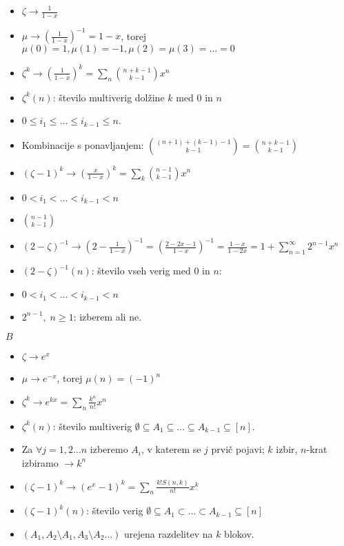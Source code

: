 \documentclass[a4paper, 12pt]{book}
\theoremstyle{definition}
\theoremstyle{remark}
\begin{document}
\begin{itemize}[label={}]
  \item $\zeta \to \frac{1}{1-x}$
  \item $\mu \to \left(\frac{1}{1-x}\right)^{-1} = 1-x$, torej $\mu(0) = 1, \mu(1) = -1, \mu(2) = \mu(3) = \dots = 0$
  \item $\zeta^k \to \left(\frac{1}{1-x}\right)^k = \sum_n \binom{n+k-1}{k-1} x^n$
  \item $\zeta^k(n)$: število multiverig dolžine $k$ med $0$ in $n$
  \item $0 \leq i_1 \leq \dots \leq i_{k-1} \leq n$.
  \item Kombinacije s ponavljanjem: $\binom{(n+1) + (k-1) - 1}{k-1} = \binom{n+k-1}{k-1}$
  \item $(\zeta-1)^k \to \left(\frac{x}{1-x}\right)^k = \sum_k \binom{n-1}{k-1} x^n$
  \item $0 < i_1 < \dots < i_{k-1} < n$
  \item $\binom{n-1}{k-1}$
  \item $(2-\zeta)^{-1} \to \left(2-\frac{1}{1-x}\right)^{-1} = \left(\frac{2-2x-1}{1-x}\right)^{-1}
    = \frac{1-x}{1-2x} = 1 + \sum_{n=1}^{\infty} 2^{n-1} x^n$
  \item $(2-\zeta)^{-1}(n)$: število vseh verig med 0 in $n$:
  \item $0 < i_1 < \dots < i_{k-1} < n$
  \item $2^{n-1}, \; n \geq 1$: izberem ali ne.
\end{itemize}
$B$
\begin{itemize}[label={}]
  \item $\zeta \to e^x$
  \item $\mu \to e^{-x}$, torej $\mu(n) = (-1)^n$
  \item $\zeta^k \to e^{kx} = \sum_n \frac{k^n}{n!} x^n$
  \item $\zeta^k(n)$: število multiverig $\emptyset \subseteq A_1 \subseteq \dots \subseteq A_{k-1} \subseteq [n]$.
  \item Za $\forall j = 1, 2 \dots n$ izberemo $A_i$, v katerem se $j$ prvič pojavi; $k$ izbir,
    $n$-krat izbiramo $\to k^n$
  \item $(\zeta-1)^k \to (e^x - 1)^k = \sum_n \frac{k! S(n, k)}{n!} x^k$
  \item $(\zeta-1)^k(n)$: število verig $\emptyset \subseteq A_1 \subset \dots \subset A_{k-1} \subseteq [n]$
  \item $(A_1, A_2 \setminus A_1, A_3 \setminus A_2 \dots)$ urejena razdelitev na $k$ blokov.
\end{itemize}
\end{document}

